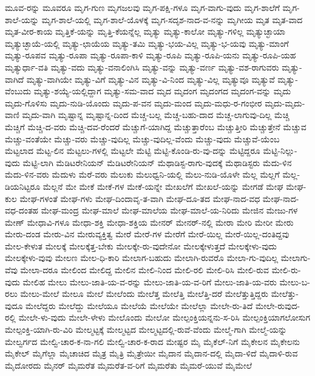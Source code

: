 {ಮೂವ-ರನ್ನು
ಮೂವರೂ
ಮೃಗ-ಗುಣ
ಮೃಗಜಲವು
ಮೃಗ-ಪಕ್ಷಿ-ಗಳೂ
ಮೃಗ-ವಾಗು-ವುದು
ಮೃಗ-ಶಾಲೆಗೆ
ಮೃಗ-ಶಾಲೆ-ಯನ್ನು
ಮೃಗ-ಶಾಲೆ-ಯಲ್ಲಿ
ಮೃಗ-ಶಾಲೆ-ಯೊಳಕ್ಕೆ
ಮೃಗ-ಸದೃಶ-ನಾದ-ವ-ನನ್ನು
ಮೃಗೀಯ
ಮೃತ
ಮೃತ-ವಾದ
ಮೃತ-ವೀರ-ಕಾಯ
ಮೃತ್ತಿಕೆ-ಯನ್ನು
ಮೃತ್ತಿ-ಕೆಯನ್ನೆಲ್ಲ
ಮೃತ್ಯು
ಮೃತ್ಯು-ಕಾಲೋ
ಮೃತ್ಯು-ಗಳಿಲ್ಲ
ಮೃತ್ಯುಚ್ಛಾಯಾ
ಮೃತ್ಯುಚ್ಛಾಯೆ-ಯಲ್ಲಿ
ಮೃತ್ಯು-ಛಾಯೆಯ
ಮೃತ್ಯು-ತಮಿ
ಮೃತ್ಯು-ಭಯ-ವಿಲ್ಲ
ಮೃತ್ಯು-ಭ-ಯವು
ಮೃತ್ಯು-ಮಾಂಗೆ
ಮೃತ್ಯು-ರೂಪವ
ಮೃತ್ಯು-ರೂಪಾ
ಮೃತ್ಯು-ರೂಪಾ-ಕಾಳಿ
ಮೃತ್ಯು-ರೂಪಿ
ಮೃತ್ಯು-ರೂಪಿ-ಯನು
ಮೃತ್ಯು-ರೂಪಿ-ಯಹ
ಮೃತ್ಯುರ್ಧಾ-ವತಿ
ಮೃತ್ಯು-ವದು
ಮೃತ್ಯು-ವನಾಲಿಂಗಿಸಿ
ಮೃತ್ಯು-ವನ್ನು
ಮೃತ್ಯು-ವರ್ಣ
ಮೃತ್ಯು-ವಶ-ರಾಗುವರು
ಮೃತ್ಯು-ವಾಗಿದೆ
ಮೃತ್ಯು-ವಾಗಿಯೇ
ಮೃತ್ಯು-ವಿಗೆ
ಮೃತ್ಯು-ವಿನ
ಮೃತ್ಯು-ವಿ-ನಿಂದ
ಮೃತ್ಯು-ವಿಲ್ಲ
ಮೃತ್ಯುವೂ
ಮೃತ್ಯುವೆ
ಮೃತ್ಯು-ವೆಂಬುದು
ಮೃತ್ಯು-ಶಯ್ಯೆ-ಯಲ್ಲಿದ್ದಾಗ
ಮೃತ್ಯು-ಸಮ-ವಾದ
ಮೃದ
ಮೃದಂಗ
ಮೃದಂಗದ
ಮೃದಂಗ-ವನ್ನು
ಮೃದು
ಮೃದು-ಗೊಳಿಸು
ಮೃದು-ನುಡಿ-ಯೊಂದು
ಮೃದು-ಪ-ವನ
ಮೃದು-ಮಂದ
ಮೃದು-ಮಧು-ರ-ಗಂಭೀರ
ಮೃದು-ಮೃದು-ವಾಣಿ
ಮೃದು-ವಾಗಿ
ಮೃಷ್ಟಾನ್ನ
ಮೃಷ್ಟಾನ್ನ-ದಿಂದ
ಮೆಚ್ಚ-ಬಲ್ಲ
ಮೆಚ್ಚ-ಬಹು-ದಾದ
ಮೆಚ್ಚ-ಲಾಗುವು-ದಿಲ್ಲ
ಮೆಚ್ಚಿ
ಮೆಚ್ಚಿಗೆ
ಮೆಚ್ಚಿ-ದ-ವರು
ಮೆಚ್ಚಿ-ದವ-ರೆಂದರೆ
ಮೆಚ್ಚುಗೆ-ಯಾಗಿದ್ದ
ಮೆಚ್ಚುತ್ತಾರೆಂಬ
ಮೆಚ್ಚುತ್ತೀರಿ
ಮೆಚ್ಚುತ್ತೇನೆ
ಮೆಚ್ಚುವ
ಮೆಚ್ಚು-ವಂತೆಯೇ
ಮೆಚ್ಚು-ವರು
ಮೆಚ್ಚು-ವುದಿಲ್ಲ
ಮೆಚ್ಚು-ವುದಿಲ್ಲ-ವೆಂದು
ಮೆಚ್ಚು-ವುದು
ಮೆಚ್ಚುವೆ-ಯೆಂಬ
ಮೆಟ್ಟಲಾದ
ಮೆಟ್ಟ-ಲಿನ
ಮೆಟ್ಟಲು-ಗಳಲ್ಲಿ
ಮೆಟ್ಟಲೇ
ಮೆಟ್ಟಿ
ಮೆಟ್ಟಿ-ಕೊಂಡಿ-ರು-ವು-ದನ್ನು
ಮೆಟ್ಟಿದ್ದರೂ
ಮೆಟ್ಟಿ-ನಿಲ್ಲು-ವುದು
ಮೆಟ್ಟಿ-ಲಾಗಿ
ಮೆಡಿಟರೇನಿಯನ್
ಮೆಡಿಟರೇನಿಯನ್
ಮೆಥಾಡಿಸ್ಟ-ರಾಗು-ವುದಕ್ಕೆ
ಮೆಥಾಡಿಸ್ಟರು
ಮೆದು-ಳಿನ
ಮೆದು-ಳಿನ-ವರು
ಮೆದುಳು
ಮೆರೆ-ವರು
ಮೆಲುಕು
ಮೆಲುಧ್ವನಿ-ಯಲ್ಲಿ
ಮೆಲು-ನುಡಿ-ಯೊಳೇ
ಮೆಲ್ಲ
ಮೆಲ್ಲಗೆ
ಮೆಲ್ಲ-ಡಿಯನಿಟ್ಟರೂ
ಮೆಲ್ಲನೆ
ಮೇ
ಮೇಕೆ
ಮೇಕೆ-ಗಳ
ಮೇಕೆ-ಯನ್ನೇ
ಮೇಖಲೆಗೆ
ಮೇಖಲೆ-ಯನ್ನು
ಮೇಗಡೆ
ಮೇಘ
ಮೇಘ-ಕುಲ
ಮೇಘ-ಗಳಂತೆ
ಮೇಘ-ಗಳು
ಮೇಘ-ದಿಂದಾವೃ-ತ-ವಾಗಿ
ಮೇಘ-ದೂ-ತದ
ಮೇಘ-ನಾದ-ವಧ
ಮೇಘ-ನಾದ-ವಧ-ದಂತಹ
ಮೇಘ-ಮಂದ್ರ
ಮೇಘ-ಮಾಲೆ
ಮೇಘ-ಮಾಲೆಯ
ಮೇಘ-ಮಾಲೆ-ಯ-ನಿರಿದು
ಮೇಜಿನ
ಮೇಜು-ಗಳ
ಮೇಣ್
ಮೇಧಾವಿ-ಗಳೂ
ಮೇಧಾ-ಶಕ್ತಿ
ಮೇಧಾ-ಶಕ್ತಿಯ
ಮೇನರ್
ಮೇನರ್-ನಲ್ಲಿ
ಮೇರಾ
ಮೇರಿ
ಮೇರೀ
ಮೇರು
ಮೇರು-ದಂಡ
ಮೇರು-ವಿನ
ಮೇರುವ್ಯಕ್ತಿತ್ವ
ಮೇರೆ
ಮೇರೆ-ಗಳ
ಮೇರೆಗೆ
ಮೇರೆ-ಯಿಲ್ಲ
ಮೇರೆ-ಯಿಲ್ಲ-ದಂತಿದ್ದವು
ಮೇಲ-ಕೇಳುತ
ಮೇಲಕ್ಕೆ
ಮೇಲಕ್ಕೆತ್ತ-ಬೇಕು
ಮೇಲಕ್ಕೇ-ರು-ವುದೇನೋ
ಮೇಲಕ್ಕೇಳುತ್ತದೆ
ಮೇಲಕ್ಕೇಳು-ವುದು
ಮೇಲಕ್ಕೇಳು-ವುವು
ಮೇಲಣ
ಮೇಲ-ಧಿ-ಕಾರಿ
ಮೇಲಾಗ-ಬಹುದು
ಮೇಲಾಗಿ-ರುವರೊ
ಮೇಲಾ-ಗು-ವುದಿಲ್ಲ
ಮೇಲಾಗು-ವೆವು
ಮೇಲಾ-ದರೂ
ಮೇಲಿಂದ
ಮೇಲಿದ್ದ
ಮೇಲಿನ
ಮೇಲಿ-ನಿಂದ
ಮೇಲಿ-ರಲಿ
ಮೇಲಿ-ರಿಸಿ
ಮೇಲಿ-ರುವ
ಮೇಲಿ-ರು-ವುದು
ಮೇಲಿಹ
ಮೇಲು
ಮೇಲು-ಜಾತಿ-ಯ-ವ-ರನ್ನು
ಮೇಲು-ಜಾತಿ-ಯ-ವ-ರಿಗೆ
ಮೇಲು-ಜಾತಿ-ಯ-ವರು
ಮೇಲು-ಬ-ರಲು
ಮೇಲು-ಮೇಲೆ
ಮೇಲೂ
ಮೇಲೆ
ಮೇಲೆಂದು
ಮೇಲೆತ್ತ
ಮೇಲೆತ್ತಿ
ಮೇಲೆತ್ತಿ-ದರೆ
ಮೇಲೆತ್ತುತ್ತಿದ್ದರು
ಮೇಲೆತ್ತು-ವುದೂ
ಮೇಲೆದ್ದರು
ಮೇಲೆದ್ದು
ಮೇಲೆಯೂ
ಮೇಲೆಯೆ
ಮೇಲೆಯೇ
ಮೇಲೆಲ್ಲಾ
ಮೇಲೇ-ರು-ತಿದೆ
ಮೇಲೇ-ರುವುದ-ರಲ್ಲಿ
ಮೇಲೇ-ಳು-ವುದು
ಮೇಲೇ-ಳೇಳು
ಮೇಲೊಂದು
ಮೇಲೋ
ಮೇಲ್ಪಂಕ್ತಿಯನ್ನನು-ಸ-ರಿಸಿ
ಮೇಲ್ಪಂಕ್ತಿಯಾಗಲೋಸುಗ
ಮೇಲ್ಪಂಕ್ತಿ-ಯಾಗಿ-ರು-ವಿರಿ
ಮೇಲ್ಮಟ್ಟಕ್ಕೆ
ಮೇಲ್ಮಟ್ಟದ
ಮೇಲ್ಮಟ್ಟದಲ್ಲಿ-ರುವೆ-ವೆಂದು
ಮೇಲ್ಮೆ-ಗಾಗಿ
ಮೇಲ್ಮೆ-ಯನ್ನು
ಮೇಲ್ವರ್ಗದ
ಮೇಲ್ವಿ-ಚಾರ-ಕ-ನಾ-ಗಲಿ
ಮೇಲ್ವಿ-ಚಾರ-ಕ-ರಾದ
ಮೇಷ್ಟರ
ಮೈ
ಮೈಕೆಲ್-ನಿಗೆ
ಮೈಕೇಲನ
ಮೈಕೇಲನು
ಮೈಕೇಲ್
ಮೈಗೆಲ್ಲಾ
ಮೈಚಾಚಿದ
ಮೈತ್ರ
ಮೈತ್ರಿ
ಮೈತ್ರೇಯೀ
ಮೈದಾನ
ಮೈದಾನ-ದಲ್ಲಿ
ಮೈದಾ-ಳಿದೆ
ಮೈದಾಳಿ-ರುವ
ಮೈದೋರದು
ಮೈನರ್
ಮೈಮರೆತ
ಮೈಮರೆತ-ವ-ರಿಗೆ
ಮೈಮರೆತು
ಮೈಮರೆ-ಯುವೆ
ಮೈಮೇಲೆ
}
